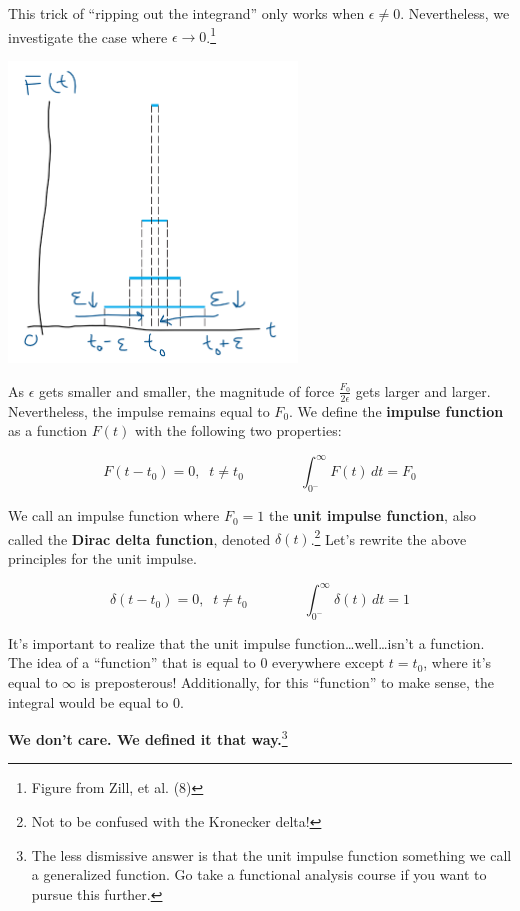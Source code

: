 \documentclass{report}
\begin{document}
\begin{onehalfspacing}
\begin{flushleft}
This trick of ``ripping out the integrand'' only works when \(\epsilon \neq 0\). Nevertheless, we investigate the case where \(\epsilon \to 0\).\footnote{Figure from Zill, et al. (8)}

\begin{center}
    {\includegraphics[height=8cm]{8_imp}}
\end{center}

As \(\epsilon\) gets smaller and smaller, the magnitude of force \(\frac{F_0}{2\epsilon}\) gets larger and larger. Nevertheless, the impulse remains equal to \(F_0\). We define the \textbf{impulse function} as a function \(F(t)\) with the following two properties:

\vspace{-0.1in}
\[F(t-t_0)=0, \; \; t\neq t_0 \qquad \qquad \int_{0^-}^\infty F(t) \, dt = F_0\]

We call an impulse function where \(F_0 = 1\) the \textbf{unit impulse function}, also called the \textbf{Dirac delta function}, denoted \(\delta(t)\).\footnote{Not to be confused with the Kronecker delta!} Let's rewrite the above principles for the unit impulse.

\vspace{-0.1in}
\[\delta(t-t_0)=0, \; \; t\neq t_0 \qquad \qquad \int_{0^-}^\infty \delta(t) \, dt = 1\]

It's important to realize that the unit impulse function\dots well\dots isn't a function. The idea of a ``function'' that is equal to 0 everywhere except \(t=t_0\), where it's equal to \(\infty\) is preposterous! Additionally, for this ``function'' to make sense, the integral would be equal to 0.

\medskip

\textbf{We don't care. We defined it that way.}\footnote{The less dismissive answer is that the unit impulse function something we call a generalized function. Go take a functional analysis course if you want to pursue this further.}


\end{flushleft}
\end{onehalfspacing}
\end{document}
